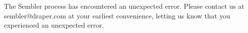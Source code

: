 \documentclass[11pt]{article}
\begin{document}


The Sembler process has encountered an unexpected error.  Please contact us at
sembler@draper.com at your earliest convenience, letting us know that you
experienced an unexpected error.
\end{document}
